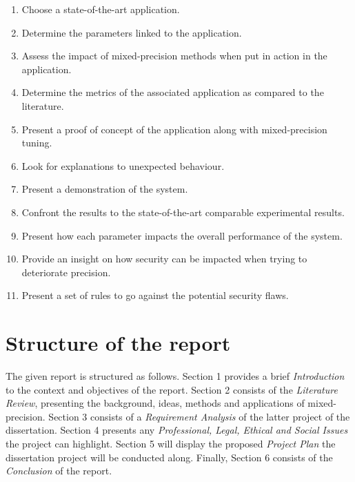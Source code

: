 \begin{enumerate}
  \item Choose a state-of-the-art application.
  \item Determine the parameters linked to the application.
  \item Assess the impact of mixed-precision methods when put in action in the application.
  \item Determine the metrics of the associated application as compared to the literature.
  \item Present a proof of concept of the application along with mixed-precision tuning.
  \item Look for explanations to unexpected behaviour.
  \item Present a demonstration of the system.
  \item Confront the results to the state-of-the-art comparable experimental results.
  \item Present how each parameter impacts the overall performance of the system.
  \item Provide an insight on how security can be impacted when trying to deteriorate precision.
  \item Present a set of rules to go against the potential security flaws.
\end{enumerate}


\section{Structure of the report}

The given report is structured as follows. Section 1 provides a brief \emph{Introduction} to the context and objectives of the report. Section 2 consists of the \emph{Literature Review}, presenting the background, ideas, methods and applications of mixed-precision. Section 3 consists of a \emph{Requirement Analysis} of the latter project of the dissertation. Section 4 presents any \emph{Professional, Legal, Ethical and Social Issues} the project can highlight. Section 5 will display the proposed \emph{Project Plan} the dissertation project will be conducted along. Finally, Section 6 consists of the \emph{Conclusion} of the report.
